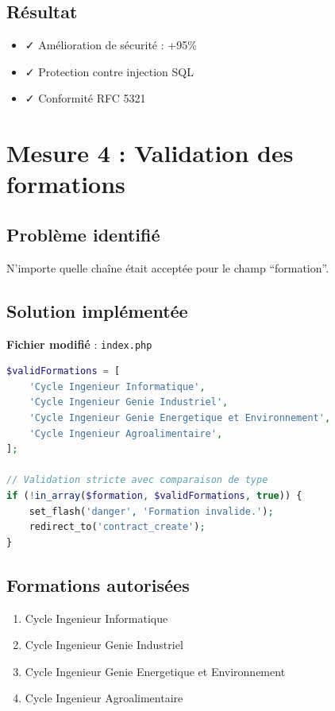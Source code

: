 \documentclass[11pt,a4paper,french]{report}
\begin{document}
\subsection{Résultat}

\begin{itemize}
    \item ✓ Amélioration de sécurité : +95\%
    \item ✓ Protection contre injection SQL
    \item ✓ Conformité RFC 5321
\end{itemize}

\newpage

\section{Mesure 4 : Validation des formations}

\subsection{Problème identifié}

N'importe quelle chaîne était acceptée pour le champ ``formation''.

\subsection{Solution implémentée}

\textbf{Fichier modifié} : \texttt{index.php}

\begin{lstlisting}[language=PHP]
$validFormations = [
    'Cycle Ingenieur Informatique',
    'Cycle Ingenieur Genie Industriel',
    'Cycle Ingenieur Genie Energetique et Environnement',
    'Cycle Ingenieur Agroalimentaire',
];

// Validation stricte avec comparaison de type
if (!in_array($formation, $validFormations, true)) {
    set_flash('danger', 'Formation invalide.');
    redirect_to('contract_create');
}
\end{lstlisting}

\subsection{Formations autorisées}

\begin{enumerate}
    \item Cycle Ingenieur Informatique
    \item Cycle Ingenieur Genie Industriel
    \item Cycle Ingenieur Genie Energetique et Environnement
    \item Cycle Ingenieur Agroalimentaire
\end{enumerate}
\end{document}
